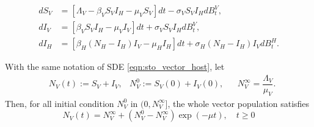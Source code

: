\begin{equation} \label{eqn:sto_vector_host}
    \begin{aligned}
        d S_V &= 
            \left [
                \Lambda_V - \beta_V S_V I_H - \mu_V S_V 
            \right ] dt
            - \sigma_V S_V I_H dB_t^V,
            \\
        d I_V &= 
            \left [
               \beta_V S_V I_H - \mu_V I_V 
            \right ]
            dt 
            + \sigma_V S_V I_H dB_t^V,
            \\
        d I_H &= 
            \left [
                \beta_H (N_H - I_H) I_V - \mu_H I_H
            \right ] dt
            + \sigma_H (N_H - I_H) I_V d B^H_t .
   \end{aligned}
\end{equation}
%
%
\begin{lemma} \label{lem:exponential_growth}
    With the same notation of SDE \eqref{eqn:sto_vector_host},
    let 
    \begin{equation*}
        \begin{aligned}
            & N_V(t):= S_V + I_V,
            & N_V^0 := S_V(0) + I_V(0),
            &&  N_V^{\infty}= \dfrac{\Lambda_V}{\mu_V}.
        \end{aligned}
    \end{equation*}
    Then, for all initial condition $N_V ^ 0 $ in $(0, N_V ^ \infty]$,
    the whole vector population satisfies
    $$
        N_V(t) = 
            N_V ^ \infty
            +
            \left(
                N_V ^ 0 - N_V ^ \infty
            \right)
            \exp(-\mu t), \quad t \geq 0
    $$
\end{lemma}